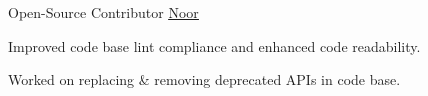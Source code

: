 

\begin{cventries}

  \cventry
    {Open-Source Contributor} %
    {\underline{\href{https://github.com/pr-Mais/noor}{Noor}}} %
    {} %
    {} %
    {
      \begin{cvitems} %
        \item {Improved code base lint compliance and enhanced code readability.}
        \item {Worked on replacing \& removing deprecated APIs in code base.}
      \end{cvitems}
    }

\end{cventries}
